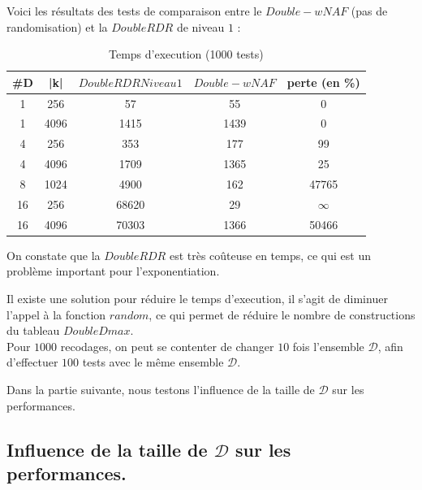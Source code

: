 \documentclass[12pt, a4paper]{memoir}
\begin{document}
Voici les résultats des tests de comparaison entre le $Double-wNAF$ (pas de randomisation) et la $DoubleRDR$ de
niveau $1$ :
\begin{table}[htbp]
\caption{Temps d'execution (1000 tests) }
\begin{center}
\begin{tabular}{ccccc}
\toprule
\#D & |k| & $DoubleRDR Niveau 1$ & $Double-wNAF$ & perte (en \%) \\
\midrule
1 & 256 & 57  & 55 & 0 \\
1 & 4096 & 1415 & 1439 & 0 \\
4 & 256 & 353 & 177 & 99 \\
4 & 4096 & 1709 & 1365 & 25 \\
8 & 1024 & 4900 & 162 & 47765 \\
16 & 256 & 68620 & 29 & $\infty$ \\
16 & 4096 & 70303 & 1366 & 50466 \\
\bottomrule
\end{tabular}
\end{center}
\label{tab:example}
\end{table}%

On constate que la $DoubleRDR$ est très coûteuse en temps, ce qui est un problème important pour l'exponentiation.

Il existe une solution pour réduire le temps d'execution, il s'agit de diminuer l'appel à la fonction $random$,
ce qui permet de réduire le nombre de constructions du tableau $DoubleDmax$. \\
Pour $1000$ recodages, on peut se contenter de changer $10$ fois l'ensemble $\mathcal{D}$, afin d'effectuer $100$
tests avec le même ensemble $\mathcal{D}$.

Dans la partie suivante, nous testons l'influence de la taille de $\mathcal{D}$ sur les performances.

\subsection{Influence de la taille de $\mathcal{D}$ sur les performances.}
\end{document}
